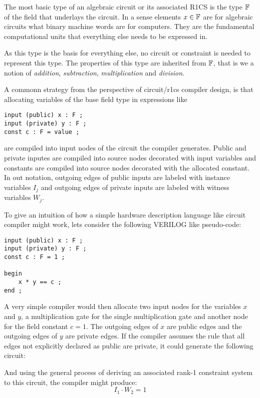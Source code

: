 The most basic type of an algebraic circuit or its associated R1CS is the type $\mathbb{F}$ of the field that underlays the circuit. In a sense elements $x\in\mathbb{F}$ are for algebraic circuits what binary machine words are for computers. They are the fundamental computational units that everything else needs to be expressed in. 

As this type is the basis for everything else, no circuit or constraint is needed to represent this type. The properties of this type are inherited from $\mathbb{F}$, that is we a notion of \textit{addition}, \textit{subtraction}, \textit{multiplication} and \textit{division}. 

A commonn strategy from the perspective of circuit/r1cs compiler design, is that allocating variables of the base field type in expressions like
\begin{lstlisting}
input (public) x : F ; 
input (private) y : F ; 
const c : F = value ; 
\end{lstlisting} 
are compiled into input nodes of the circuit the compiler generates. Public and private inputes are compiled into source nodes decorated with input variables and constants are compiled into source nodes decorated with the allocated constant. In out notation, outgoing edges of public inputs are labeled with instance variables $I_j$ and outgoing edges of private inputs are labeled with witness variables $W_j$.
\begin{example} To give an intuition of how a simple hardware description language like circuit compiler might work, lets consider the following VERILOG like pseudo-code:
\begin{lstlisting}
input (public) x : F ; 
input (private) y : F ; 
const c : F = 1 ; 

begin
	x * y == c ;
end ;
\end{lstlisting}
A very simple compiler would then allocate two input nodes for the variables $x$ and $y$, a multiplication gate for the single multiplication gate and another node for the field constant $c=1$. The outgoing edges of $x$ are public edges and the outgoing edges of $y$ are private edges. If the compiler assumes the rule that all edges not explicitly declared as public are private, it could generate the following circuit: 
\begin{center}
\end{center} 
And using the general process of deriving an associated rank-1 constraint system to this circuit, the compiler might produce:
$$
I_1 \cdot W_2 =1
$$
\end{example} 
